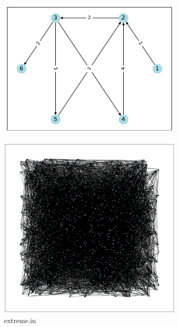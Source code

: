 \documentclass[a4paper,oneside]{book}
\begin{document}
\begin{figure}[!ht]
\begin{subfigure}[b]{0.3\textwidth}
        \includegraphics[width=\textwidth]{src/loop2.pdf}
    \end{subfigure}
    \begin{subfigure}[b]{0.3\textwidth}
        \centering
        \caption{extreme.in}
        \includegraphics[width=\textwidth]{src/extreme.pdf}
    \end{subfigure}
    \begin{subfigure}[b]{0.3\textwidth}
        \centering

\end{subfigure}
\end{figure}
\end{document}
